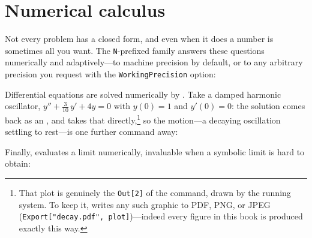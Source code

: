 \section{Numerical calculus}
\label{sec:intro-numcalc}

Not every problem has a closed form, and even when it does a number is sometimes all
you want. The \texttt{N}-prefixed family answers these questions numerically and
adaptively---to machine precision by default, or to any arbitrary precision you request
with the \texttt{WorkingPrecision} option:

\begin{codepairs}
\end{codepairs}

Differential equations are solved numerically by . Take a damped harmonic
oscillator, $y'' + \tfrac{3}{10}\,y' + 4y = 0$ with $y(0)=1$ and $y'(0)=0$: the solution
comes back as an , and  takes that
directly,\footnote{That plot is genuinely the \texttt{Out[2]} of the  command,
drawn by the running system. To keep it,  writes any such graphic to PDF, PNG,
or JPEG (\texttt{Export["decay.pdf", plot]})---indeed every figure in this book is
produced exactly this way.} so the motion---a decaying oscillation settling to rest---is
one further command away:


Finally,  evaluates a limit numerically, invaluable when a symbolic limit is
hard to obtain:

\begin{codepairs}
\end{codepairs}

